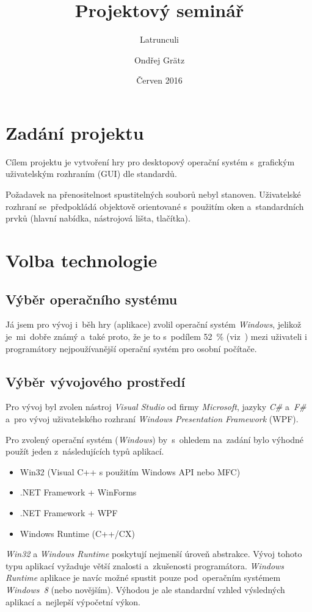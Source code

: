 \documentclass[12pt]{article}
\title{Projektový seminář}
\subtitle{Latrunculi}
\author{Ondřej Grätz}
\date{Červen 2016}
\begin{document}
\maketitle

\newpage
\section{Zadání projektu}
Cílem projektu je vytvoření hry pro desktopový operační systém s~grafickým uživatelským rozhraním (GUI) dle standardů.

Požadavek na přenositelnost spustitelných souborů nebyl stanoven. Uživatelské rozhraní se~předpokládá objektově orientované s~použitím oken a~standardních prvků (hlavní nabídka, nástrojová lišta, tlačítka).

\section{Volba technologie}
\subsection{Výběr operačního systému}
Já jsem pro vývoj i~běh hry (aplikace) zvolil operační systém \emph{Windows}, jelikož je~mi~dobře známý a~také proto, že je to s~podílem 52~\% (viz~\cite{wiki2016}) mezi uživateli i programátory nejpoužívanější operační systém pro osobní počítače.

\subsection{Výběr vývojového prostředí}
Pro vývoj byl zvolen nástroj \emph{Visual Studio} od firmy \emph{Microsoft}, jazyky \emph{C\#} a~\emph{F\#} a~pro vývoj uživatelského rozhraní \emph{Windows Presentation Framework} (WPF).

Pro zvolený operační systém (\emph{Windows}) by~s~ohledem na~zadání bylo výhodné použít jeden z~následujících typů aplikací. 
	\begin{itemize}  
		\item Win32 (Visual C++ s použitím Windows API nebo MFC)
		\item .NET Framework + WinForms
		\item .NET Framework + WPF
		\item Windows Runtime (C++/CX) 
	\end{itemize}

\emph{Win32} a \emph{Windows Runtime} poskytují nejmenší úroveň abstrakce. Vývoj tohoto typu aplikací vyžaduje větší znalosti a~zkušenosti programátora. \emph{Windows Runtime} aplikace je navíc možné spustit pouze pod~operačním systémem \emph{Windows~8} (nebo novějším). Výhodou je ale standardní vzhled výsledných aplikací a~nejlepší výpočetní výkon.
\end{document}
